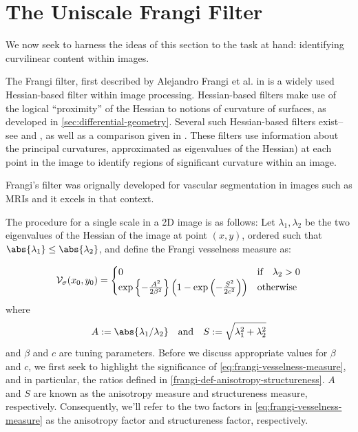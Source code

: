 \chapter{The Uniscale Frangi Filter} \label{ch:unifrangi}

	We now seek to harness the ideas of this section to the task at hand: identifying curvilinear content within images.

The Frangi filter, first described by Alejandro Frangi et al. in \cite{frangi-paper} is a widely used  Hessian-based filter
within image processing. Hessian-based filters make use of the
logical ``proximity'' of the Hessian to notions of curvature of surfaces,
as developed in \cref{sec:differential-geometry}. 
Several such Hessian-based filters exist--see \cite{sato-filter} and \cite{lorenz-filter}, as well as a comparison given in \cite{olabarriaga-hessian-comparison}. These filters use information about the principal curvatures, approximated as eigenvalues of the Hessian) at each point in the image
to identify regions of significant curvature within an image.


Frangi's filter was orignally developed for vascular segmentation in images such as MRIs and it excels in that context.

The procedure for a single scale in a 2D image is as follows:
Let $\lambda_1, \lambda_2$ be the two eigenvalues of the Hessian of the image at point $(x, y)$,
ordered such that $\abs{\lambda_1} \leq \abs{\lambda_2}$, and define the Frangi vesselness measure %
as:

\begin{equation} \label{eq:frangi-vesselness-measure}
\mathcal{V}_{\sigma}(x_0,y_0) = \begin{cases}
0 & \text{if} \quad \lambda_2 > 0 \\
\exp\left\{-\frac{A^2}{2\beta^2}\right\}
\left(1 - \exp\left(-\frac{S^2}{2c^2}\right)\right) & \text{otherwise}
\end{cases} \end{equation}
where
\begin{equation} \label{frangi-def-anisotropy-structureness}
A := \abs{\lambda_1 / \lambda_2}
\quad \textrm{and} \quad 
S := \sqrt{\lambda_1^2 + \lambda_2^2}
\end{equation}
and $\beta$ and $c$ are tuning parameters. Before we discuss appropriate values for $\beta$ and $c$, we first seek to highlight the significance of \cref{eq:frangi-vesselness-measure}, and in particular, the ratios defined in
\cref{frangi-def-anisotropy-structureness}. $A$ and $S$ are known as the anisotropy measure and structureness measure, respectively. Consequently, we'll refer to the two factors in \cref{eq:frangi-vesselness-measure} as the anisotropy factor and structureness factor, respectively. 

